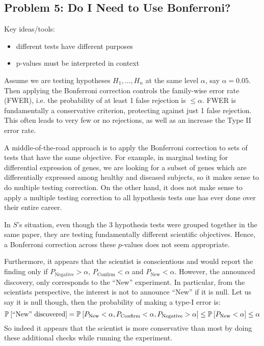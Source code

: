 \subsection*{Problem 5: Do I Need to Use Bonferroni?}
Key ideas/tools:
\begin{itemize}
\item different tests have different purposes
\item p-values must be interpreted in context
\end{itemize}

Assume we are testing hypotheses $H_1, \dots, H_n$ at the same level $\alpha$, say $\alpha=0.05$. Then applying the Bonferroni correction controls the family-wise error rate (FWER), i.e. the probability of at least 1 false rejection is $\leq \alpha$. FWER is fundamentally a conservative criterion, protecting against just 1 false rejection. This often leads to very few or no rejections, as well as an increase the Type II error rate. 

A middle-of-the-road approach is to apply the Bonferroni correction to sets of tests that have the same objective. For example, in marginal testing for differential expression of genes, we are looking for a subset of genes which are differentially expressed among healthy and diseased subjects, so it makes sense to do multiple testing correction. On the other hand, it does not make sense to apply a multiple testing correction to all hypothesis tests one has ever done over their entire career.

In $S$'s situation, even though the 3 hypothesis tests were grouped together in the same paper, they are testing fundamentally different scientific objectives. Hence, a Bonferroni correction across these $p$-values does not seem appropriate.

Furthermore, it appears that the scientist is conscientious and would report the finding only if $P_{\text{Negative}} > \alpha$, $P_{\text{Confirm}} < \alpha$ and $P_{\text{New}} < \alpha$. However, the announced discovery, only corresponds to the ``New'' experiment. In particular, from the scientists perspective, the interest is not to announce ``New'' if it is null. Let us say it is null though, then the probability of making a type-I error is:
$$ \mathbb{P}_{}\left[ \text{``New'' discovered}\right] = \mathbb{P}_{}\left[ P_{\text{New}} < \alpha, P_{\text{Confirm}} < \alpha, P_{\text{Negative}} > \alpha\right] \leq \mathbb{P}_{}\left[ P_{\text{New}} < \alpha \right] \leq \alpha $$
So indeed it appears that the scientist is more conservative than most by doing these additional checks while running the experiment.


